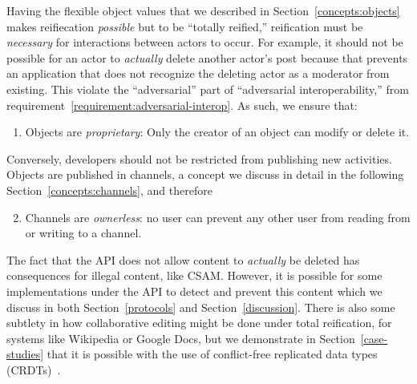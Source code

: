 
Having the flexible object values that we described in Section~\ref{concepts:objects}
makes reifiecation \emph{possible} but to be ``totally reified,''
reification must be \emph{necessary} for interactions between
actors to occur.
For example, it should not be possible for an actor to \emph{actually}
delete another actor's post because that prevents
an application that does not recognize the deleting actor as a moderator from existing.
This violate the ``adversarial'' part of ``adversarial interoperability,''
from requirement~\ref{requirement:adversarial-interop}.
As such, we ensure that:
\begin{enumerate}
\item
Objects are \emph{proprietary}: Only the creator of an object can modify or delete it.
\end{enumerate}
Conversely, developers should not be restricted from publishing new
activities.
Objects are published in channels, a concept we discuss in detail
in the following Section~\ref{concepts:channels}, and therefore
\begin{enumerate}
\setcounter{enumi}{1}
\item
Channels are \emph{ownerless}: no user can prevent any other user from reading from or writing to a channel.
\end{enumerate}

The fact that the API does not allow content to \emph{actually} be deleted
has consequences for illegal content, like CSAM.
However, it is possible for some implementations under the API to detect
and prevent this content which we discuss in both
Section~\ref{protocols} and Section~\ref{discussion}.
There is also some subtlety in how collaborative editing might be done under total reification,
for systems like Wikipedia or Google Docs,
but we demonstrate in Section~\ref{case-studies} that
it is possible with the use of conflict-free replicated data types (CRDTs)~\cite{crdts}.



